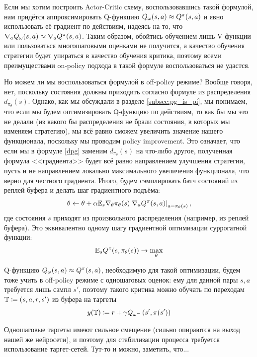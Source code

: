 Если мы хотим построить Actor-Critic схему, воспользовавшись такой формулой, нам придётся аппроксимировать Q-функцию $Q_\omega(s, a) \HM \approx Q^\pi(s, a)$ и явно использовать её градиент по действиям, надеясь на то, что $\nabla_a Q_\omega(s, a) \HM\approx \nabla_a Q^\pi(s, a)$. Таким образом, обойтись обучением лишь V-функции или пользоваться многошаговыми оценками не получится, а качество обучения стратегии будет упираться в качество обучения критика, поэтому всеми преимуществами on-policy подхода в такой формуле воспользоваться не удастся.

Но можем ли мы воспользоваться формулой в off-policy режиме? Вообще говоря, нет, поскольку состояния должны приходить согласно формуле из распределения $d_{\pi_\theta}(s)$. Однако, как мы обсуждали в разделе \ref{subsec:pg_is_pi}, мы понимаем, что если мы будем оптимизировать Q-функцию по действиям, то как бы мы это не делали (из какого бы распределения не брали состояния, в которых мы изменяем стратегию), мы всё равно сможем увеличить значение нашего функционала, поскольку мы проводим policy improvement. Это означает, что если мы в формуле \eqref{dpg} заменим $d_{\pi_\theta}(s)$ на что-либо другое, полученная формула <<градиента>> будет всё равно направлением улучшения стратегии, пусть и не направлением локально максимального увеличения функционала, что верно для честного градиента. Итого, будем сэмплировать батч состояний из реплей буфера и делать шаг градиентного подъёма: 
$$\theta \leftarrow \theta + \alpha \mathbb{E}_{s} \nabla_\theta \pi_\theta(s) \left. \nabla_a Q^{\pi}(s, a) \right|_{a = \pi_\theta(s)},$$
где состояния $s$ приходят из произвольного распределения (например, из реплей буфера). Это эквивалентно одному шагу градиентной оптимизации суррогатной функции:
\begin{equation}\label{ddpg_actor}
\mathbb{E}_s Q^{\pi}(s, \pi_{\theta}(s)) \to \max_{\theta}
\end{equation}

Q-функцию $Q_\omega(s, a) \HM \approx Q^\pi(s, a)$, необходимую для такой оптимизации, будем тоже учить в off-policy режиме с одношаговых оценок: ему для данной пары $s,a$ требуется лишь сэмпл $s'$, поэтому такого критика можно обучать по переходам $\mathbb{T} \coloneqq (s, a, r, s')$ из буфера на таргеты
$$y(\mathbb{T}) \coloneqq r + \gamma Q_{\omega^{-}}\left( s', \pi(s') \right)$$

Одношаговые таргеты имеют сильное смещение (сильно опираются на выход нашей же нейросети), и поэтому для стабилизации процесса требуется использование таргет-сетей. Тут-то и можно, заметить, что...

